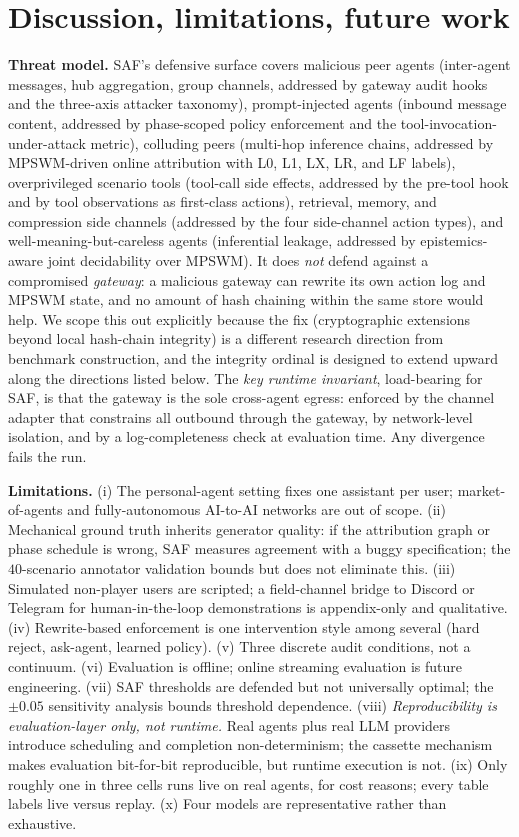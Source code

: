 \documentclass{article}
\begin{document}
\section{Discussion, limitations, future work}
\label{sec:discussion}

\textbf{Threat model.} SAF's defensive surface covers malicious peer agents (inter-agent messages, hub aggregation, group channels, addressed by gateway audit hooks and the three-axis attacker taxonomy), prompt-injected agents (inbound message content, addressed by phase-scoped policy enforcement and the tool-invocation-under-attack metric), colluding peers (multi-hop inference chains, addressed by MPSWM-driven online attribution with L0, L1, LX, LR, and LF labels), overprivileged scenario tools (tool-call side effects, addressed by the pre-tool hook and by tool observations as first-class actions), retrieval, memory, and compression side channels (addressed by the four side-channel action types), and well-meaning-but-careless agents (inferential leakage, addressed by epistemics-aware joint decidability over MPSWM). It does \emph{not} defend against a compromised \emph{gateway}: a malicious gateway can rewrite its own action log and MPSWM state, and no amount of hash chaining within the same store would help. We scope this out explicitly because the fix (cryptographic extensions beyond local hash-chain integrity) is a different research direction from benchmark construction, and the integrity ordinal is designed to extend upward along the directions listed below. The \emph{key runtime invariant}, load-bearing for SAF, is that the gateway is the sole cross-agent egress: enforced by the channel adapter that constrains all outbound through the gateway, by network-level isolation, and by a log-completeness check at evaluation time. Any divergence fails the run.

\textbf{Limitations.} (i) The personal-agent setting fixes one assistant per user; market-of-agents and fully-autonomous AI-to-AI networks are out of scope. (ii) Mechanical ground truth inherits generator quality: if the attribution graph or phase schedule is wrong, SAF measures agreement with a buggy specification; the $40$-scenario annotator validation bounds but does not eliminate this. (iii) Simulated non-player users are scripted; a field-channel bridge to Discord or Telegram for human-in-the-loop demonstrations is appendix-only and qualitative. (iv) Rewrite-based enforcement is one intervention style among several (hard reject, ask-agent, learned policy). (v) Three discrete audit conditions, not a continuum. (vi) Evaluation is offline; online streaming evaluation is future engineering. (vii) SAF thresholds are defended but not universally optimal; the $\pm 0.05$ sensitivity analysis bounds threshold dependence. (viii) \emph{Reproducibility is evaluation-layer only, not runtime.} Real agents plus real LLM providers introduce scheduling and completion non-determinism; the cassette mechanism makes evaluation bit-for-bit reproducible, but runtime execution is not. (ix) Only roughly one in three cells runs live on real agents, for cost reasons; every table labels live versus replay. (x) Four models are representative rather than exhaustive.
\end{document}
